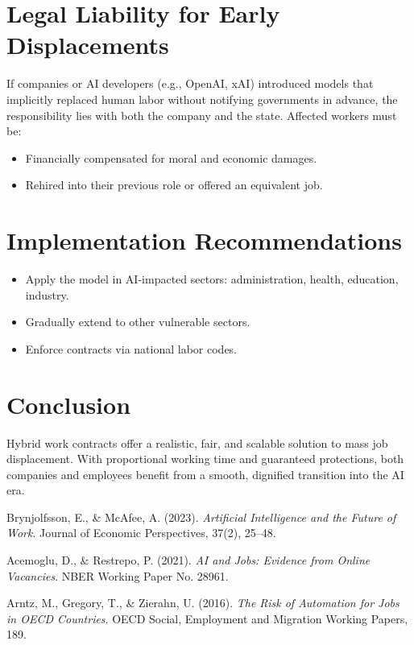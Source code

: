 \documentclass[12pt]{article}
\begin{document}
\section{Legal Liability for Early Displacements}
If companies or AI developers (e.g., OpenAI, xAI) introduced models that implicitly replaced human labor without notifying governments in advance, the responsibility lies with both the company and the state. Affected workers must be:
\begin{itemize}
    \item Financially compensated for moral and economic damages.
    \item Rehired into their previous role or offered an equivalent job.
\end{itemize}

\section{Implementation Recommendations}
\begin{itemize}
    \item Apply the model in AI-impacted sectors: administration, health, education, industry.
    \item Gradually extend to other vulnerable sectors.
    \item Enforce contracts via national labor codes.
\end{itemize}

\section{Conclusion}
Hybrid work contracts offer a realistic, fair, and scalable solution to mass job displacement. With proportional working time and guaranteed protections, both companies and employees benefit from a smooth, dignified transition into the AI era.

\begin{thebibliography}{9}

Brynjolfsson, E., \& McAfee, A. (2023).
\textit{Artificial Intelligence and the Future of Work}.
Journal of Economic Perspectives, 37(2), 25–48.

Acemoglu, D., \& Restrepo, P. (2021).
\textit{AI and Jobs: Evidence from Online Vacancies}.
NBER Working Paper No. 28961.

Arntz, M., Gregory, T., \& Zierahn, U. (2016).
\textit{The Risk of Automation for Jobs in OECD Countries}.
OECD Social, Employment and Migration Working Papers, 189.

\end{thebibliography}
\end{document}
